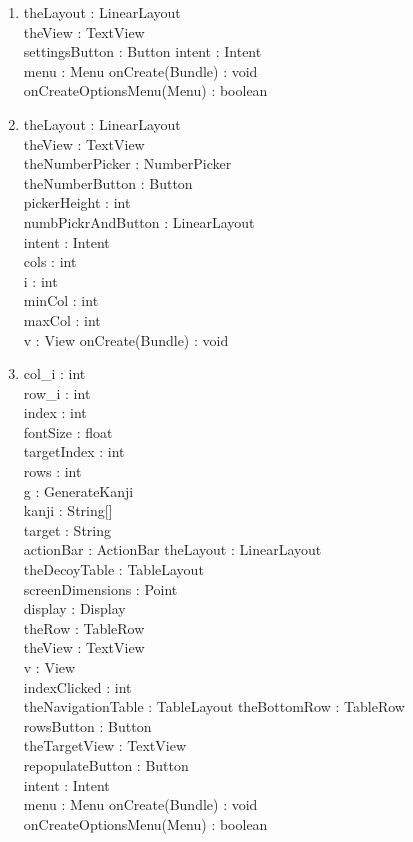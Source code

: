 \documentclass[11pt,asymmetric]{article}
\begin{document}
\begin{enumerate}

\item {}
 {theLayout : LinearLayout\\
 theView : TextView\\
 settingsButton : Button
 intent : Intent\\
 menu : Menu
 }
 {onCreate(Bundle) : void\\
 onCreateOptionsMenu(Menu) : boolean}


\item {}
 {theLayout : LinearLayout\\
 theView : TextView\\
 theNumberPicker : NumberPicker \\
 theNumberButton : Button\\
 pickerHeight : int\\
 numbPickrAndButton : LinearLayout\\
 intent : Intent\\
 cols : int\\
 i : int\\
 minCol : int\\
 maxCol : int\\
 v : View
 }
 {onCreate(Bundle) : void}


\item {}
 {col\_i : int\\
 row\_i : int\\
 index : int\\
 fontSize : float\\
 targetIndex : int\\
 rows : int\\
 g : GenerateKanji\\
 kanji : String[]\\
 target : String\\
 actionBar : ActionBar
 theLayout : LinearLayout\\
 theDecoyTable : TableLayout\\
 screenDimensions : Point\\
 display : Display\\
 theRow : TableRow\\
 theView : TextView\\
 v : View\\
 indexClicked : int\\
 theNavigationTable : TableLayout
 theBottomRow : TableRow\\
 rowsButton : Button\\
 theTargetView : TextView\\
 repopulateButton : Button\\
 intent : Intent\\
 menu : Menu
 }
 {onCreate(Bundle) : void\\
 onCreateOptionsMenu(Menu) : boolean}




\end{enumerate}
\end{document}
